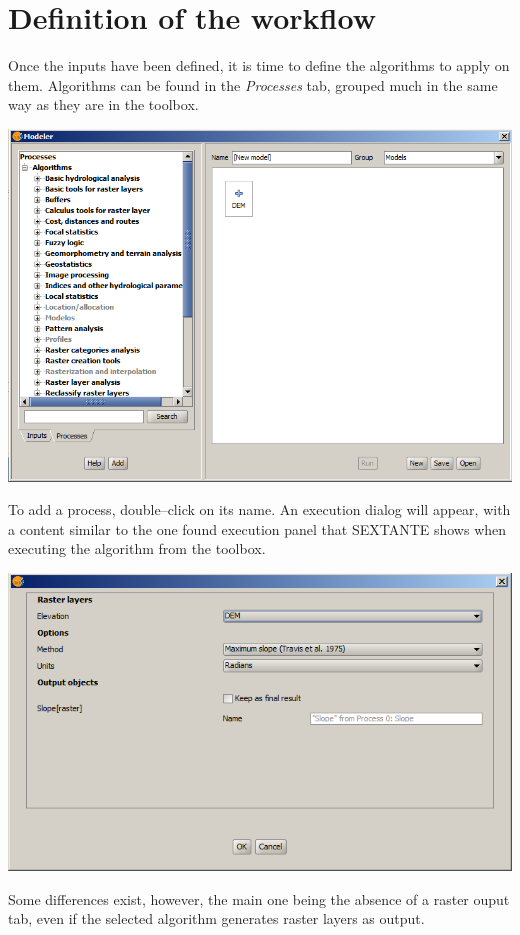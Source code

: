 \section{Definition of the workflow}

Once the inputs have been defined, it is time to define the algorithms to apply on them. Algorithms can be found in the \emph{Processes} tab, grouped much in the same way as they are in the toolbox.

\begin{center}
\includegraphics[width=.8\columnwidth]{models_parameters3.png}
\end{center}

To add a process, double--click on its name. An execution dialog will appear, with a content similar to the one found execution panel that SEXTANTE shows when executing the algorithm from the toolbox.

\begin{center}
\includegraphics[width=.8\columnwidth]{models_parameters4.png}
\end{center}

Some differences exist, however, the main one being the absence of a raster ouput tab, even if the selected algorithm generates raster layers as output.

